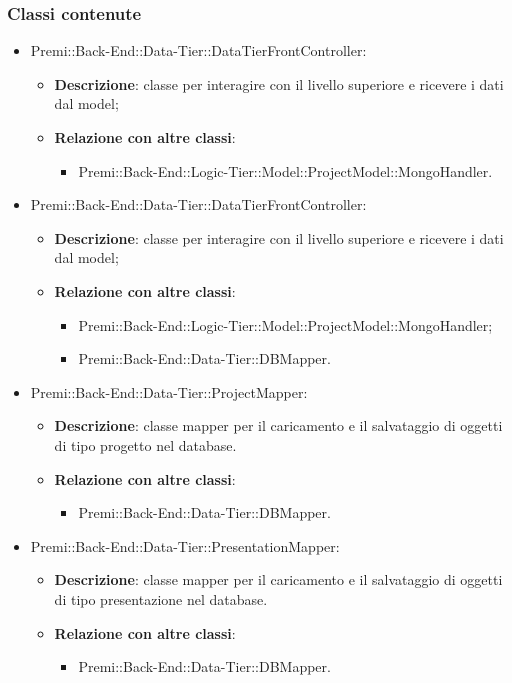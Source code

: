 		\subsubsection*{Classi contenute}
		\begin{itemize}
			\item Premi::Back-End::Data-Tier::DataTierFrontController:
				\begin{itemize}
					\item \textbf{Descrizione}: classe per interagire con il livello superiore e ricevere i dati dal model;
					\item \textbf{Relazione con altre classi}:
					\begin{itemize}
						\item Premi::Back-End::Logic-Tier::Model::ProjectModel::MongoHandler.
					\end{itemize}
				\end{itemize}
			
			\item Premi::Back-End::Data-Tier::DataTierFrontController:
				\begin{itemize}
					\item \textbf{Descrizione}: classe per interagire con il livello superiore e ricevere i dati dal model;
					\item \textbf{Relazione con altre classi}:
					\begin{itemize}
						\item Premi::Back-End::Logic-Tier::Model::ProjectModel::MongoHandler;
						\item Premi::Back-End::Data-Tier::DBMapper.
					\end{itemize}
				\end{itemize}
				
			\item Premi::Back-End::Data-Tier::ProjectMapper:
			\begin{itemize}
				\item \textbf{Descrizione}: classe mapper per il caricamento e il salvataggio di oggetti di tipo progetto nel database.
				\item \textbf{Relazione con altre classi}:
				\begin{itemize}
					\item Premi::Back-End::Data-Tier::DBMapper.
				\end{itemize}
			\end{itemize}
				
			\item Premi::Back-End::Data-Tier::PresentationMapper:
			\begin{itemize}
				\item \textbf{Descrizione}: classe mapper per il caricamento e il salvataggio di oggetti di tipo presentazione nel database.
				\item \textbf{Relazione con altre classi}:
				\begin{itemize}
					\item Premi::Back-End::Data-Tier::DBMapper.
				\end{itemize}
			\end{itemize}
			

\end{itemize}
